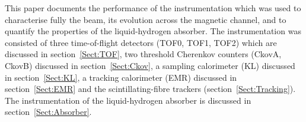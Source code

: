 This paper documents the performance of the instrumentation which was
used to characterise fully the beam, its evolution across the magnetic
channel, and to quantify the properties of the liquid-hydrogen
absorber.
The instrumentation was consisted of three time-of-flight detectors
(TOF0, TOF1, TOF2) which are discussed in section~\ref{Sect:TOF}, two 
threshold Cherenkov counters (CkovA, CkovB) discussed in
section~\ref{Sect:Ckov}, a sampling calorimeter (KL) discussed in
section~\ref{Sect:KL}, a tracking calorimeter (EMR) discussed in
section~\ref{Sect:EMR} and the scintillating-fibre trackers
(section~\ref{Sect:Tracking}).
The instrumentation of the liquid-hydrogen absorber is discussed in
section~\ref{Sect:Absorber}.

